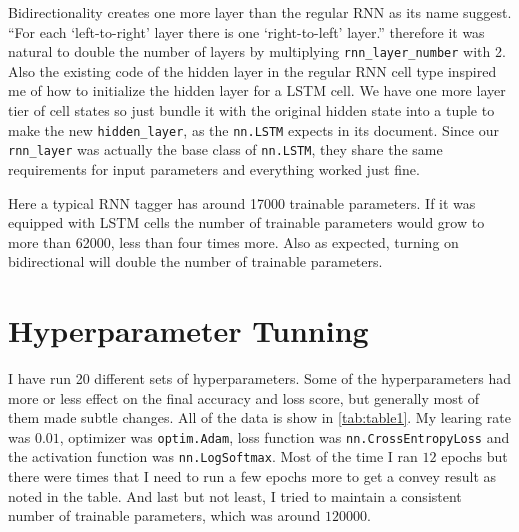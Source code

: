 \documentclass[11pt]{article} %
\begin{document}
Bidirectionality creates one more layer than the regular RNN as its name suggest. ``For each `left-to-right' layer there is one `right-to-left' layer.'' therefore it was natural to double the number of layers by multiplying \verb|rnn_layer_number| with 2. Also the existing code of the hidden layer in the regular RNN cell type inspired me of how to initialize the hidden layer for a LSTM cell. We have one more layer tier of cell states so just bundle it with the original hidden state into a tuple to make the new \verb|hidden_layer|, as the \verb|nn.LSTM| expects in its document. Since our \verb|rnn_layer| was actually the base class of \verb|nn.LSTM|, they share the same requirements for input parameters and everything worked just fine.

Here a typical RNN tagger has around 17000 trainable parameters. If it was equipped with LSTM cells the number of trainable parameters would grow to more than 62000, less than four times more. Also as expected, turning on bidirectional will double the number of trainable parameters.

\section{Hyperparameter Tunning}

I have run 20 different sets of hyperparameters. Some of the hyperparameters had more or less effect on the final accuracy and loss score, but generally most of them made subtle changes. All of the data is show in \ref{tab:table1}. My learing rate was $0.01$, optimizer was \verb|optim.Adam|, loss function was \verb|nn.CrossEntropyLoss| and the activation function was \verb|nn.LogSoftmax|. Most of the time I ran $12$ epochs but there were times that I need to run a few epochs more to get a convey result as noted in the table. And last but not least, I tried to maintain a consistent number of trainable parameters, which was around $120000$.
\end{document}

